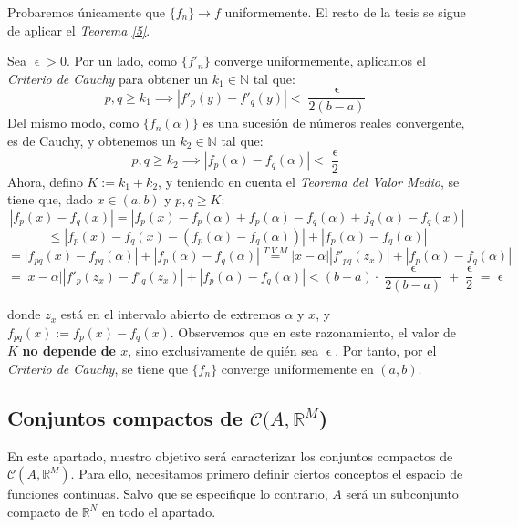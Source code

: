 \documentclass[11pt, a4paper]{article}
\makeatletter
\newif\IfInSansMode
\let\oldsf\sffamily
\renewcommand*{\sffamily}{\oldsf\mathversion{sans}\InSansModetrue}
\let\oldnorm\normalfont
\renewcommand*{\normalfont}{\oldnorm\InSansModefalse\mathversion{normal}}
\let\epsilon\upvarepsilon
\newcommand{\fn}{\{f_n\}}
\renewenvironment{proof}[1][\proofname] {\par\pushQED{\qed}\normalfont\topsep6\p@\@plus6\p@\relax\trivlist\item[\hskip\labelsep\itshape\sffamily#1\@addpunct{.}]\ignorespaces}{\popQED\endtrivlist\@endpefalse}
\theoremstyle{theorem-style}
\theoremstyle{definition-style}
\theoremstyle{remark-style}
\theoremstyle{example-style}
\makeatother
\begin{document}
  \begin{proof}
    Probaremos únicamente que $\fn \to f$ uniformemente. El resto de la tesis se sigue de aplicar el \textit{Teorema \ref{5}}.
    
    Sea $\epsilon > 0$. Por un lado, como $\{f'_n\}$ converge uniformemente, aplicamos el \textit{Criterio de Cauchy} para obtener un $k_1 \in \mathbb{N}$ tal que: $$p,q \ge k_1 \implies |f'_p(y) - f'_q(y)| < \frac{\epsilon}{2 (b-a)}$$
    Del mismo modo, como $\{f_n(\alpha)\}$ es una sucesión de números reales convergente, es de Cauchy, y obtenemos un $k_2 \in \mathbb{N}$ tal que: $$p,q \ge k_2 \implies |f_p(\alpha) - f_q(\alpha)| < \frac{\epsilon}{2}$$
    Ahora, defino $K := k_1 + k_2$, y teniendo en cuenta el \textit{Teorema del Valor Medio}, se tiene que, dado $x \in (a,b)$ y $p,q \ge K$: $$|f_p(x) - f_q(x)| = |f_p(x) - f_p(\alpha) + f_p(\alpha) - f_q(\alpha) + f_q(\alpha) - f_q(x)|$$ $$\le |f_p(x) - f_q(x) - (f_p(\alpha) - f_q(\alpha))| + |f_p(\alpha) - f_q(\alpha)| $$ $$= |f_{pq}(x) - f_{pq}(\alpha)| + |f_p(\alpha) - f_q(\alpha)| \overset{T.V.M}{=} |x-\alpha||f'_{pq}(z_x)| + |f_p(\alpha) - f_q(\alpha)|$$ $$= \left|x-\alpha \right|\left| f'_p(z_x) - f'_q(z_x) \right| + |f_p(\alpha) - f_q(\alpha)| < (b-a) \cdot \frac{\epsilon}{2(b-a)} + \frac{\epsilon}{2} = \epsilon$$

    donde $z_x$ está en el intervalo abierto de extremos $\alpha$ y $x$, y $f_{pq}(x) := f_p(x) - f_q(x)$. Observemos que en este razonamiento, el valor de $K$ \textbf{no depende de $x$}, sino exclusivamente de quién sea $\epsilon$. Por tanto, por el \textit{Criterio de Cauchy}, se tiene que $\{f_n\}$ converge uniformemente en $(a,b)$.
  \end{proof}


\subsection{Conjuntos compactos de $\mathcal{C}(A, \mathbb{R}^M$)}

En este apartado, nuestro objetivo será caracterizar los conjuntos compactos de $\mathcal{C}(A,\mathbb{R}^M)$. Para ello, necesitamos primero definir ciertos conceptos el espacio de funciones continuas. Salvo que se especifique lo contrario, $A$ será un subconjunto compacto de $\mathbb{R}^N$ en todo el apartado.
\end{document}
